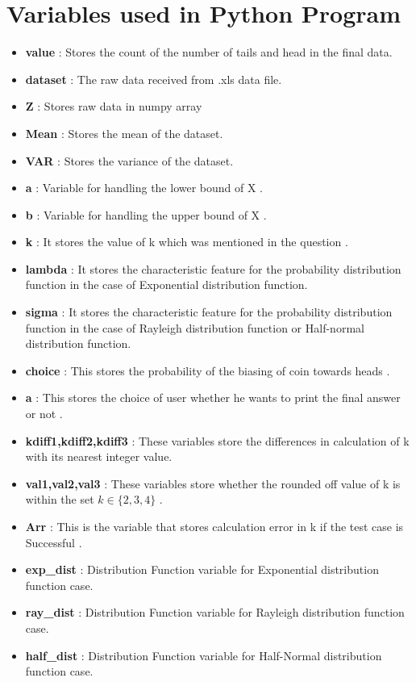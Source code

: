 \documentclass{article}
\begin{document}
\section{Variables used in Python Program}
\vspace{20pt}
\begin{itemize}
    \item \textbf{value} : Stores the count of the number of tails and head in the final data.
    \item \textbf{dataset} : The raw data received from .xls data file.
    \item \textbf{Z} : Stores raw data in numpy array
    \item \textbf{Mean} : Stores the mean of the dataset.
    \item \textbf{VAR} : Stores the variance of the dataset.
    \item \textbf{a} : Variable for handling the lower bound of X .
    \item \textbf{b} :  Variable for handling the upper bound of X .
    \item \textbf{k} : It stores the value of k which was mentioned in the question .
    \item \textbf{lambda} : It stores the characteristic feature for the probability distribution function in the case of Exponential distribution function.
    \item \textbf{sigma} : It stores the characteristic feature for the probability distribution function in the case of Rayleigh distribution function or Half-normal distribution function.
    \item \textbf{choice} : This stores the probability of the biasing of coin towards heads .
    \item \textbf{a} : This stores the choice of user whether he wants to print the final answer or not .
    \item \textbf{kdiff1,kdiff2,kdiff3} : These variables store the differences in calculation of k with its nearest integer value.
    \item \textbf{val1,val2,val3} : These variables store whether the rounded off value of k is within the set $k \in \{ 2,3,4\}  $ .
    \item \textbf{Arr} : This is the variable that stores calculation error in k if the test case is Successful .
    \item \textbf{exp\_dist} : Distribution Function variable for Exponential distribution function case.
    \item \textbf{ray\_dist} : Distribution Function variable for Rayleigh distribution function case.
    \item \textbf{half\_dist} : Distribution Function variable for Half-Normal distribution function case.
\end{itemize}
\newpage
\end{document}
